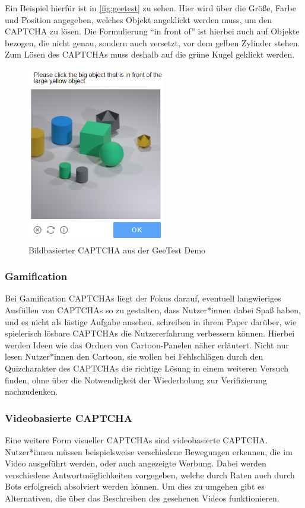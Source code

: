 Ein Beispiel hierfür ist in \autoref{fig:geetest} zu sehen.
Hier wird über die Größe, Farbe und Position angegeben, welches Objekt angeklickt werden muss, um den CAPTCHA zu lösen.
Die Formulierung ``in front of'' ist hierbei auch auf Objekte bezogen, die nicht genau, sondern auch versetzt, vor dem gelben Zylinder stehen.
Zum Lösen des CAPTCHAs muss deshalb auf die grüne Kugel geklickt werden.

\begin{figure}[h!]
        \centering
        \includegraphics[width=6cm]{gfx/mygraphics/raeumlich.png} 
    \caption{Bildbasierter CAPTCHA aus der GeeTest Demo}
    \label{fig:geetest}
\end{figure}

\subsubsection*{Gamification}
Bei Gamification CAPTCHAs liegt der Fokus darauf, eventuell langwieriges Ausfüllen von CAPTCHAs so zu gestalten, dass Nutzer*innen dabei Spaß haben,
und es nicht als lästige Aufgabe ansehen.
\citeauthor{gamified} schreiben in ihrem Paper  darüber, wie spielerisch lösbare CAPTCHAs die Nutzererfahrung verbessern können.
Hierbei werden Ideen wie das Ordnen von Cartoon-Panelen näher erläutert.
Nicht nur lesen Nutzer*innen den Cartoon, sie wollen bei Fehlschlägen durch den Quizcharakter des CAPTCHAs die richtige Lösung in einem weiteren Versuch finden,
ohne über die Notwendigkeit der Wiederholung zur Verifizierung nachzudenken. \cite[p.41ff]{gamified}


\subsubsection*{Videobasierte CAPTCHA}
Eine weitere Form visueller CAPTCHAs sind videobasierte CAPTCHA. 
Nutzer*innen müssen beispielsweise verschiedene Bewegungen erkennen, die im Video ausgeführt werden,
oder auch angezeigte Werbung.
Dabei werden verschiedene Antwortmöglichkeiten vorgegeben, welche durch Raten auch durch Bots erfolgreich absolviert werden können.
Um dies zu umgehen gibt es Alternativen, die über das Beschreiben des gesehenen Videos funktionieren. \cite[p.xx]{surveyofresearch} 

